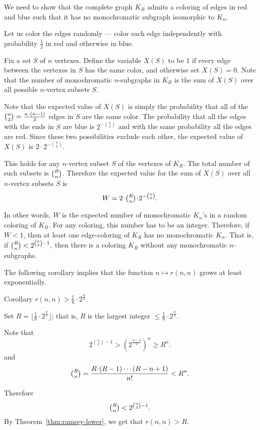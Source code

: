 We need to show that the complete graph $K_R$
admits a coloring of edges in red and blue such that it has no monochromatic subgraph isomorphic to $K_n$.

Let us color the edges randomly ---
color each edge independently with probability $\tfrac12$ in red and otherwise in blue.

Fix a set $S$ of $n$ vertexes. 
Define the variable $X(S)$ to be $1$ if every edge between the vertexes in $S$ has the same color, and otherwise set $X(S)=0$.
Note that the number of monochromatic $n$-subgraphs in $K_R$ is the sum of $X(S)$ over all possible $n$-vertex subsets $S$. 

Note that the expected value of $X(S)$ is simply the probability that all of the $\tbinom n 2=\tfrac{n\cdot(n-1)}{2}$
edges in $S$ are the same color. 
The probability that all the edges with the ends in $S$ are blue is ${2^{-\binom n 2}}$ and with the same probability all the edges are red.
Since these two possibilities exclude each other, the expected value of $X(S)$ is 
${2}\cdot {2^{-\binom n 2}}.$

This holds for any $n$-vertex subset $S$ of the vertexes of $K_R$.
The total number of such subsets is $\tbinom R n$.
Therefore the expected value for the sum of $X(S)$ over all $n$-vertex subsets $S$ is
\[W=2\cdot \tbinom R n\cdot 2^{-\binom n 2}.\]

In other words, $W$ is the expected number of monochromatic $K_n$'s in a random coloring of $K_R$.
For any coloring, this number has to be an integer.
Therefore, if $W<1$, then at least one edge-coloring of $K_R$ has no monochromatic $K_n$. 
That is, if
$\tbinom R n < 2^{\binom n 2 - 1},$
then there is a coloring $K_R$ without any monochromatic $n$-subgraphs.
\qeds

The following corollary implies that the function $n\mapsto r(n,n)$ grows at least exponentially. 

\begin{thm}{Corollary}\label{cor:2^n/2}
$r(n, n)> \tfrac1{8}\cdot 2^{\frac{n}{2}}$.
\end{thm}

Set $R=\lfloor\tfrac1{8}\cdot 2^{\frac{n}{2}}\rfloor$;
that is, $R$ is the largest integer $\le\tfrac1{8}\cdot 2^{\frac{n}{2}}$.

Note that 
\[2^{\binom n 2 - 1}> (2^{\frac{n-3}2})^n\ge R^n.\]
and
\[\tbinom R n=\frac{R\cdot(R-1)\cdots (R-n+1)}{n!}<  R^n.\]

Therefore  
\[\tbinom R n<2^{\binom n 2 - 1}.\]
By Theorem~\ref{thm:ramsey-lower}, we get that $r(n,n)> R$.
\qeds

